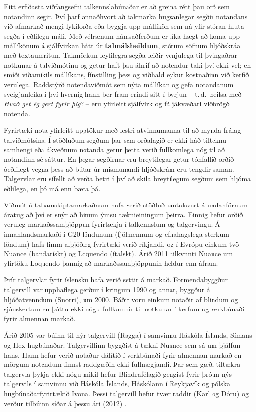 \begin{multicols}{2}
Eitt erfiðasta viðfangsefni talkennslabúnaðar er að greina rétt þau orð sem notandinn segir. Því þarf annaðhvort að takmarka hugsanlegar segðir notandans við afmarkað mengi lykilorða eða byggja upp mállíkön sem ná yfir stóran hluta segða í eðlilegu máli. Með vélrænum námsaðferðum er líka hægt að koma upp mállíkönum á sjálfvirkan hátt úr \textbf{talmálsheildum}, stórum söfnum hljóðskráa með textaumritun. Takmörkun leyfilegra segða leiðir venjulega til þvingaðrar notkunar á talviðmótinu og getur haft þau áhrif að notendur taki því ekki vel; en smíði viðamikils mállíkans, fínstilling þess og viðhald eykur kostnaðinn við kerfið verulega. Raddstýrð notendaviðmót sem nýta mállíkan og gefa notandanum sveigjanleika í því hvernig hann ber fram erindi sitt í byrjun -- t.\,d.~heilsa með \textit{Hvað get ég gert fyrir þig}? -- eru yfirleitt sjálfvirk og fá jákvæðari viðbrögð notenda.

Fyrirtæki nota yfirleitt upptökur með lestri atvinnumanna til að mynda frálag talviðmótsins. Í stöðluðum segðum þar sem orðalagið er ekki háð tilteknu samhengi eða ákveðnum notanda getur þetta verið fullkomlega nóg til að notandinn sé sáttur. En þegar segðirnar eru breytilegar getur tónfallið orðið óeðlilegt vegna þess að bútar úr mismunandi hljóðskrám eru tengdir saman. Talgervlar eru sífellt að verða betri í því að skila breytilegum segðum sem hljóma eðlilega, en þó má enn bæta þá.

Viðmót á talsamskiptamarkaðnum hafa verið stöðluð umtalsvert á undanförnum áratug að því er snýr að hinum ýmsu tæknieiningum þeirra. Einnig hefur orðið veruleg markaðssamþjöppun fyrirtækja í talkennslum og talgervingu. Á innanlandsmarkaði í G20-löndunum (fjölmennum og efnahagslega sterkum löndum) hafa fimm alþjóðleg fyrirtæki verið ríkjandi, og í Evrópu einkum tvö -- Nuance (bandarískt) og Loquendo (ítalskt). Árið 2011 tilkynnti Nuance um yfirtöku Loquendo þannig að markaðssamþjöppunin heldur enn áfram.

Þrír talgervlar fyrir íslensku hafa verið settir á markað. Formendabyggður talgervill var upphaflega gerður í kringum 1990 og annar, byggður á hljóðatvenndum (Snorri), um 2000. Báðir voru einkum notaðir af blindum og sjónskertum en þóttu ekki nógu fullkomnir til notkunar í kerfum og verkbúnaði fyrir almennan markað. 

Árið 2005 var búinn til nýr talgervill (Ragga) í samvinnu Háskóla Íslands, Símans og Hex hugbúnaðar. Talgervillinn byggðist á tækni Nuance sem sá um þjálfun hans. Hann hefur verið notaður dálítið í verkbúnaði fyrir almennan markað en mörgum notendum finnst raddgæðin ekki fullnægjandi. Þar sem gæði tiltækra talgervla þykja ekki nógu mikil hefur Blindrafélagið gengist fyrir þróun nýs talgervils í samvinnu við Háskóla Íslands, Háskólann í Reykjavík og pólska hugbúnaðarfyrirtækið Ivona. Þessi talgervill hefur tvær raddir (Karl og Dóru) og verður tilbúinn síðar á þessu ári (2012) \cite{tal1}.


\end{multicols}
